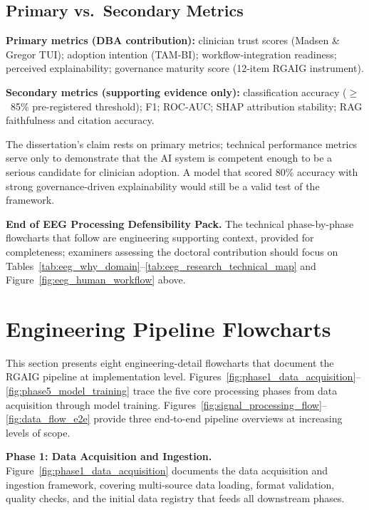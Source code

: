\subsection*{Primary vs.\ Secondary Metrics}
\label{sec:eeg_metrics_priority}

\noindent\textbf{Primary metrics (DBA contribution):} clinician trust scores (Madsen \& Gregor TUI); adoption intention (TAM-BI); workflow-integration readiness; perceived explainability; governance maturity score (12-item RGAIG instrument).

\noindent\textbf{Secondary metrics (supporting evidence only):} classification accuracy ($\geq$~85\% pre-registered threshold); F1; ROC-AUC; SHAP attribution stability; RAG faithfulness and citation accuracy.

\noindent The dissertation's claim rests on primary metrics; technical performance metrics serve only to demonstrate that the AI system is competent enough to be a serious candidate for clinician adoption. A model that scored 80\% accuracy with strong governance-driven explainability would still be a valid test of the framework.

\noindent\textbf{End of EEG Processing Defensibility Pack.} The technical phase-by-phase flowcharts that follow are engineering supporting context, provided for completeness; examiners assessing the doctoral contribution should focus on Tables~\ref{tab:eeg_why_domain}--\ref{tab:eeg_research_technical_map} and Figure~\ref{fig:eeg_human_workflow} above.

\section{Engineering Pipeline Flowcharts}
\label{sec:appendix_ch3_engineering_flowcharts}

This section presents eight engineering-detail flowcharts that document the RGAIG pipeline at implementation level. Figures~\ref{fig:phase1_data_acquisition}--\ref{fig:phase5_model_training} trace the five core processing phases from data acquisition through model training. Figures~\ref{fig:signal_processing_flow}--\ref{fig:data_flow_e2e} provide three end-to-end pipeline overviews at increasing levels of scope.


\noindent\textbf{Phase 1: Data Acquisition and Ingestion.} Figure~\ref{fig:phase1_data_acquisition} documents the data acquisition and ingestion framework, covering multi-source data loading, format validation, quality checks, and the initial data registry that feeds all downstream phases.

